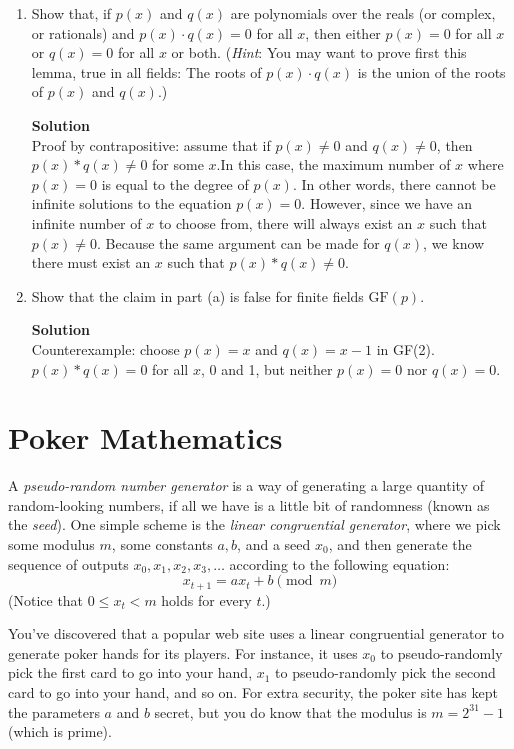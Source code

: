 \documentclass[11pt]{article}
\newcommand*{\Question}[1]{\section{#1}}
\newenvironment{Parts}{\begin{enumerate}[label=(\alph*)]}{\end{enumerate}}
\newcommand*{\Part}{\item}
\newenvironment{Answer}{\vspace{10pt}\begin{mdframed}\textbf{Solution}\\}{\end{mdframed}\vfill\pagebreak[3]}
\newenvironment{Answer}{\vspace{10pt}}{\vfill\pagebreak[3]}
\newcommand*{\GF}{\text{GF}}
\begin{document}
\begin{Parts}
    \Part Show that, if $p(x)$ and $q(x)$ are polynomials over the
    reals (or complex, or rationals) and $p(x)\cdot q(x) = 0$ for all
    $x$, then either $p(x)=0$ for all $x$ or $q(x)=0$ for all $x$ or both.
    (\textit{Hint}: You may want to prove first this lemma, true in all fields:
    The roots of $p(x)\cdot q(x)$ is the union of the roots of $p(x)$ and $q(x)$.)
    \begin{Answer}
        Proof by contrapositive: assume that if $p(x) \not = 0$ and $q(x) \not = 0$, then $p(x)*q(x) \not = 0$ for some $x$.In this case, the maximum number of $x$ where $p(x)=0$ is equal to the degree of $p(x)$. In other words, there cannot be infinite solutions to the equation $p(x)=0$. However, since we have an infinite number of $x$ to choose from, there will always exist an $x$ such that $p(x) \not =0$. Because the same argument can be made for $q(x)$, we know there must exist an $x$ such that $p(x)*q(x) \not = 0$.
    \end{Answer}
    
    \Part Show that the claim in part (a) is false for finite fields $\GF(p)$. 
    \begin{Answer}
        Counterexample: choose $p(x)=x$ and $q(x)=x-1$ in GF(2). $p(x)*q(x)=0$ for all $x$, 0 and 1, but neither $p(x)=0$ nor $q(x)=0$.
    \end{Answer}
\end{Parts}


\Question{Poker Mathematics}   

A \emph{pseudo-random number generator} is a way of generating a large quantity of random-looking numbers, if all we have is a little bit of randomness (known as the \emph{seed}). One simple scheme is the \emph{linear congruential generator}, where we pick some modulus $m$, some constants $a,b$, and a seed $x_0$, and then generate the sequence of outputs $x_0,x_1,x_2,x_3,\dots$ according to the following equation:
\[ 
x_{t+1} = ax_t + b \pmod m
\]
(Notice that $0 \le x_t < m$ holds for every $t$.)

You've discovered that a popular web site uses a linear congruential generator to generate poker hands for its players.  For instance, it uses $x_0$ to pseudo-randomly pick the first card to go into your hand, $x_1$ to pseudo-randomly pick the second card to go into your hand, and so on. For extra security, the poker site has kept the parameters $a$ and $b$ secret, but you do know that the modulus is $m=2^{31}-1$ (which is prime).
\end{document}

